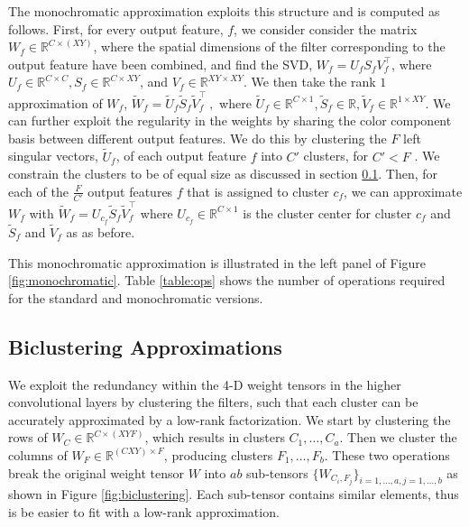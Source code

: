 The monochromatic approximation exploits this structure and is computed as follows.
First, for every output feature, $f$, we consider consider the matrix $W_f \in \mathbb{R}^{C \times (XY) }$, 
where the spatial dimensions of the filter corresponding to the output feature have been combined, and find the SVD, 
$W_f = U_f S_f V_f^{\top}$,
where $U_f \in \mathbb{R}^{C \times C}, S_f \in \mathbb{R}^{C \times XY}$, and $V_f \in \mathbb{R}^{XY \times XY}$. 
We then take the rank $1$ approximation of $W_f$, 
	$\tilde{W}_f = \tilde{U}_f \tilde{S}_f \tilde{V}_f^{\top} ~,$
where $\tilde{U}_f \in \mathbb{R}^{C \times 1}, \tilde{S}_f \in \mathbb{R}, \tilde{V}_f \in \mathbb{R}^{1 \times XY}$.
We can further exploit the regularity in the weights by sharing the color component basis between different output features. 
We do this by clustering the $F$ left singular vectors, $\tilde{U}_f$, of each output feature $f$ into $C'$ clusters, 
for $C' < F$  . We constrain the clusters to be of equal size as discussed in section \ref{subsec:clustering}.  
Then, for each of the $\frac{F}{C'}$ output features $f$ that is assigned to cluster $c_f$, we can approximate $W_f$ with
	$\tilde{W}_f = U_{c_f} \tilde{S}_f \tilde{V}_f^{\top}$
where $U_{c_f} \in \mathbb{R}^{C \times 1}$ is the cluster center for cluster $c_f$ and $\tilde{S}_f$ and $\tilde{V}_f$ as as before. 

This monochromatic approximation is illustrated in the left panel of Figure \ref{fig:monochromatic}.
Table \ref{table:ops} shows the number of operations required for the standard and monochromatic versions.

\subsection{Biclustering Approximations}\label{subsec:clustering}

We exploit the redundancy within the 4-D weight tensors in the higher convolutional layers
by clustering the filters, such that each cluster can
be accurately approximated by a low-rank factorization. 
We start by clustering the rows of $W_C \in \mathbb{R}^{C \times (XYF)}$, which results in
clusters $C_1, \dots, C_a$. Then we cluster the columns of $W_F  \in
\mathbb{R}^{(CXY) \times F}$, producing clusters $F_1,
\dots, F_b$. These two operations break the original weight tensor $W$
into $ab$ sub-tensors $\{W_{C_i, F_j}\}_{i = 1, \dots, a, j = 1,
  \dots, b}$ as shown in Figure \ref{fig:biclustering}. Each
sub-tensor contains similar elements, thus is be easier to
fit with a low-rank approximation. 

